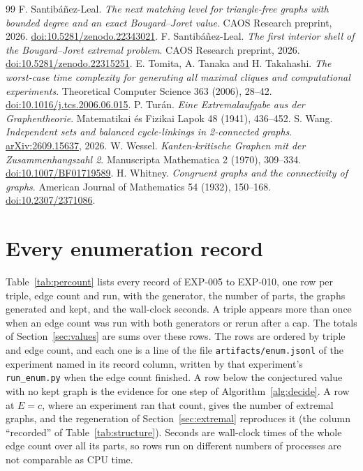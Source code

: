 \documentclass[11pt]{article}
\theoremstyle{definition}
\theoremstyle{remark}
\begin{document}
\begin{thebibliography}{99}
 F. Santib\'a\~nez-Leal. \emph{The next matching level for triangle-free graphs with bounded degree and an
exact Bougard--Joret value}. CAOS Research preprint, 2026.
\href{https://doi.org/10.5281/zenodo.22343021}{doi:10.5281/zenodo.22343021}.
 F. Santib\'a\~nez-Leal. \emph{The first interior shell of the Bougard--Joret extremal problem}. CAOS
Research preprint, 2026. \href{https://doi.org/10.5281/zenodo.22315251}{doi:10.5281/zenodo.22315251}.
 E. Tomita, A. Tanaka and H. Takahashi. \emph{The worst-case time complexity for generating all maximal
cliques and computational experiments}. Theoretical Computer Science 363 (2006), 28--42.
\href{https://doi.org/10.1016/j.tcs.2006.06.015}{doi:10.1016/j.tcs.2006.06.015}.
 P. Tur\'an. \emph{Eine Extremalaufgabe aus der Graphentheorie}. Matematikai \'es Fizikai Lapok 48
(1941), 436--452.
 S. Wang. \emph{Independent sets and balanced cycle-linkings in 2-connected graphs}.
\href{https://arxiv.org/abs/2609.15637}{arXiv:2609.15637}, 2026.
 W. Wessel. \emph{Kanten-kritische Graphen mit der Zusammenhangszahl 2}. Manuscripta Mathematica 2
(1970), 309--334. \href{https://doi.org/10.1007/BF01719589}{doi:10.1007/BF01719589}.
 H. Whitney. \emph{Congruent graphs and the connectivity of graphs}. American Journal
of Mathematics 54 (1932), 150--168. \href{https://doi.org/10.2307/2371086}{doi:10.2307/2371086}.
\end{thebibliography}

\FloatBarrier
\clearpage
\appendix
\section{Every enumeration record}\label{app:records}
Table~\ref{tab:percount} lists every record of EXP-005 to EXP-010, one row per triple, edge count and run, with the
generator, the number of parts, the graphs generated and kept, and the wall-clock seconds. A triple appears more than
once when an edge count was run with both generators or rerun after a cap. The totals of Section~\ref{sec:values} are
sums over these rows. The rows are ordered by triple and edge count, and each one is a line of the file
\texttt{artifacts/enum.jsonl} of the experiment named in its record column, written by that experiment's
\texttt{run\_enum.py} when the edge count finished. A row below the conjectured value with no kept graph is the
evidence for one step of Algorithm~\ref{alg:decide}. A row at $E=c$, where an experiment ran that count, gives the
number of extremal graphs, and the regeneration of Section~\ref{sec:extremal} reproduces it (the column ``recorded''
of Table~\ref{tab:structure}). Seconds are wall-clock times of the whole edge count over all its parts, so rows run on
different numbers of processes are not comparable as CPU time.
{\scriptsize\setlength{\tabcolsep}{4pt}
}
\end{document}
